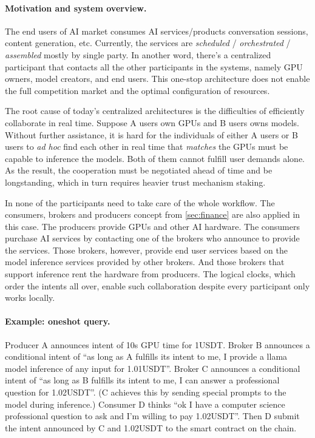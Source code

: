 \paragraph{Motivation and system overview.}
The end users of AI market consumes AI services/products \eg conversation sessions, content generation, etc.
Currently, the services are \emph{scheduled} / \emph{orchestrated} / \emph{assembled} mostly by single party.
In another word, there's a centralized participant that contacts all the other participants in the systems, namely GPU owners, model creators, and end users.
This one-stop architecture does not enable the full competition market and the optimal configuration of resources.

The root cause of today's centralized architectures is the difficulties of efficiently collaborate in real time.
Suppose A users own GPUs and B users owns models.
Without further assistance, it is hard for the individuals of either A users or B users to \emph{ad hoc} find each other in real time that \emph{matches} \ie the GPUs must be capable to inference the models.
Both of them cannot fulfill user demands alone.
As the result, the cooperation must be negotiated ahead of time and be longstanding, which in turn requires heavier trust mechanism \eg staking.

In \sys none of the participants need to take care of the whole workflow.
The consumers, brokers and producers concept from \autoref{sec:finance} are also applied in this case.
The producers provide GPUs and other AI hardware.
The consumers purchase AI services by contacting one of the brokers who announce to provide the services.
Those brokers, however, provide end user services based on the model inference services provided by other brokers.
And those brokers that support inference rent the hardware from producers.
The logical clocks, which order the intents all over, enable such collaboration despite every participant only works locally.

\paragraph{Example: oneshot query.}
Producer A announces intent of 10s GPU time for 1USDT.
Broker B announces a conditional intent of ``as long as A fulfills its intent to me, I provide a llama model inference of any input for 1.01USDT''.
Broker C announces a conditional intent of ``as long as B fulfills its intent to me, I can answer a professional question for 1.02USDT''.
(C achieves this by sending special prompts to the model during inference.)
Consumer D thinks ``ok I have a computer science professional question to ask and I'm willing to pay 1.02USDT''.
Then D submit the intent announced by C and 1.02USDT to the \sys smart contract on the chain.

